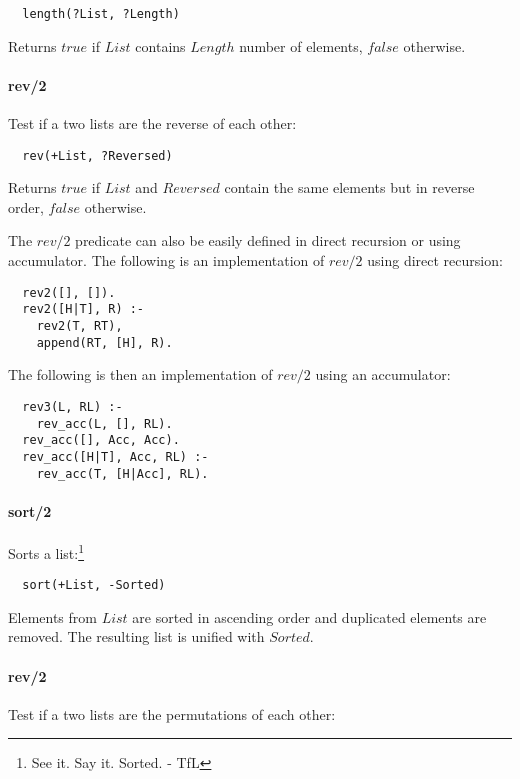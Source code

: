 \documentclass{article}
\begin{document}
\begin{multicols}{2}
  \begin{lstlisting}
  length(?List, ?Length)
  \end{lstlisting} 
  
  Returns $true$ if $List$ contains $Length$ number of elements, $false$ otherwise.
  
  \paragraph{rev/2} Test if a two lists are the reverse of each other:
  
  \begin{lstlisting}
  rev(+List, ?Reversed)
  \end{lstlisting} 
  
  Returns $true$ if $List$ and $Reversed$ contain the same elements but in reverse order, $false$ otherwise.
  
  The $rev/2$ predicate can also be easily defined in direct recursion or using accumulator. The following is an implementation of $rev/2$ using direct recursion:
  
  \begin{lstlisting}
  rev2([], []).
  rev2([H|T], R) :-
    rev2(T, RT),
    append(RT, [H], R).
  \end{lstlisting}
  
  The following is then an implementation of $rev/2$ using an accumulator:
  
  \begin{lstlisting}
  rev3(L, RL) :-
    rev_acc(L, [], RL).
  rev_acc([], Acc, Acc).
  rev_acc([H|T], Acc, RL) :-
    rev_acc(T, [H|Acc], RL).
  \end{lstlisting}
  
  \paragraph{sort/2} Sorts a list:\footnote{See it. Say it. Sorted. - TfL}
  
  \begin{lstlisting}
  sort(+List, -Sorted)
  \end{lstlisting} 
  
  Elements from $List$ are sorted in ascending order and duplicated elements are removed. The resulting list is unified with $Sorted$.
  
  \paragraph{rev/2} Test if a two lists are the permutations of each other:
  

\end{multicols}
\end{document}
